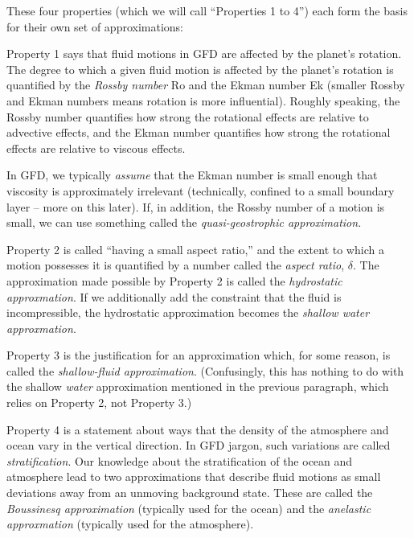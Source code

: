 \documentclass[11pt]{book}
\begin{document}
These four properties (which we will call ``Properties 1 to 4'') each form the basis for their own set of approximations:

Property 1 says that fluid motions in GFD are affected by the planet's rotation.  The degree to which a given fluid motion is affected by the planet's rotation is quantified by the \emph{Rossby number} Ro and the Ekman number Ek (smaller Rossby and Ekman numbers means rotation is more influential).  Roughly speaking, the Rossby number quantifies how strong the rotational effects are relative to advective effects, and the Ekman number quantifies how strong the rotational effects are relative to viscous effects.

In GFD, we typically \emph{assume} that the Ekman number is small enough that viscosity is approximately irrelevant (technically, confined to a small boundary layer -- more on this later).  If, in addition, the Rossby number of a motion is small, we can use something called the \emph{quasi-geostrophic approximation.}

Property 2 is called ``having a small aspect ratio,'' and the extent to which a motion possesses it is quantified by a number called the \emph{aspect ratio}, $\delta$.  The approximation made possible by Property 2 is called the \emph{hydrostatic approxmation}.  If we additionally add the constraint that the fluid is incompressible, the hydrostatic approximation becomes the \emph{shallow water approxmation}.

Property 3 is the justification for an approximation which, for some reason, is called the \emph{shallow-fluid approximation}.  (Confusingly, this has nothing to do with the shallow \emph{water} approximation mentioned in the previous paragraph, which relies on Property 2, not Property 3.)

Property 4 is a statement about ways that the density of the atmosphere and ocean vary in the vertical direction.  In GFD jargon, such variations are called \emph{stratification}.  Our knowledge about the stratification of the ocean and atmosphere lead to two approximations that describe fluid motions as small deviations away from an unmoving background state.  These are called the \emph{Boussinesq approximation} (typically used for the ocean) and the \emph{anelastic approxmation} (typically used for the atmosphere).
\end{document}
